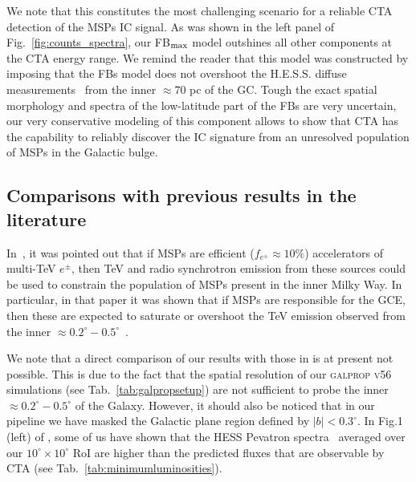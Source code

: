 \documentclass[doublespace,nopageskip]{VTthesis} %
\begin{document}
We note that this constitutes the most challenging scenario for a reliable CTA detection of the MSPs IC signal. As was shown in the left panel of Fig.~\ref{fig:counts_spectra}, our FB$_{\rm max}$ model outshines all other components at the CTA energy range. We remind the reader that this model was constructed by imposing that the FBs model does not overshoot the H.E.S.S. diffuse  measurements~\citep{Abramowski:2016mir} from the inner $\approx 70$ pc of the GC. Tough the exact spatial morphology and spectra of the low-latitude part of the FBs are very uncertain, our very conservative modeling of this component allows to show that CTA has the capability to reliably discover the IC signature from an unresolved population of MSPs in the Galactic bulge.    
 
\subsection{Comparisons with previous results in the literature}
 
In~\citet{Hooper:2018fih}, it was pointed out that if MSPs are efficient ($f_{e^\pm}\approx 10\%$) accelerators of multi-TeV $e^\pm$, then TeV and radio synchrotron emission from these sources could be used to constrain the population of MSPs present in the inner Milky Way. In particular, in that paper it was shown that if MSPs are responsible for the GCE, then these are expected to saturate or overshoot the TeV emission observed from the inner $\approx 0.2^\circ-0.5^\circ$~\citep{Abramowski:2016mir}. 
 
We note that a direct comparison of our results with those in \citet{Hooper:2018fih} is at present not possible. This is due to the fact that the spatial resolution of our \textsc{galprop v56} simulations (see Tab.~\ref{tab:galpropsetup}) are not sufficient to probe the inner $\approx 0.2^\circ-0.5^\circ$ of the Galaxy. However, it should also be noticed that in our pipeline we have masked the Galactic plane region defined by $|b|<0.3^\circ$. In Fig.1 (left) of \citep{Rinchiuso:2020skh}, some of us have shown that the HESS Pevatron spectra~\citep{Abramowski:2016mir} averaged over our $10^\circ \times 10^\circ$ RoI are higher than the predicted fluxes that are observable by CTA (see Tab.~\ref{tab:minimumluminosities}). 
\end{document}
